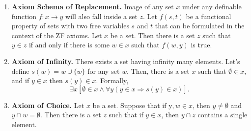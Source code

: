 \documentclass[a4paper,english,12pt]{article}
\begin{document}
\begin{enumerate}
	\item \textbf{Axiom Schema of Replacement.} Image of any set $x$ under any definable function $f:x \to y$ will also fall inside a set $z$. Let $f(s, t)$ be a functional property of sets with two free variables $s$ and $t$  that can be formulated in the context of the ZF axioms. Let ${x}$ be a set. Then there is a set ${z}$ such that $y\in {z}$ if and only if there is some $w \in {x}$ such that $f(w, y)$ is true.
	
 \item \textbf{Axiom of Infinity.} There exists a set having infinity many elements. Let's define $s(w) = w \cup \{w\}$ for any set $w$. Then, there is a set ${x}$ such that $\emptyset  \in {x}$, and if ${y} \in {x}$ then $s(y) \in {x}$. Formally,
\begin{equation*}
 \exists x [\emptyset \in x \wedge \forall y ( y \in x \Rightarrow s(y) \in x)].
\end{equation*}

\item \textbf{Axiom of Choice.} Let $x$ be a set. Suppose that if y$,w \in x$, then $y \neq \emptyset$ and $y\cap w = \emptyset$. Then there is a set $z$ such that if $y \in x$, then $y\cap z$ contains a single element. %
 \end{enumerate}
\end{document}
